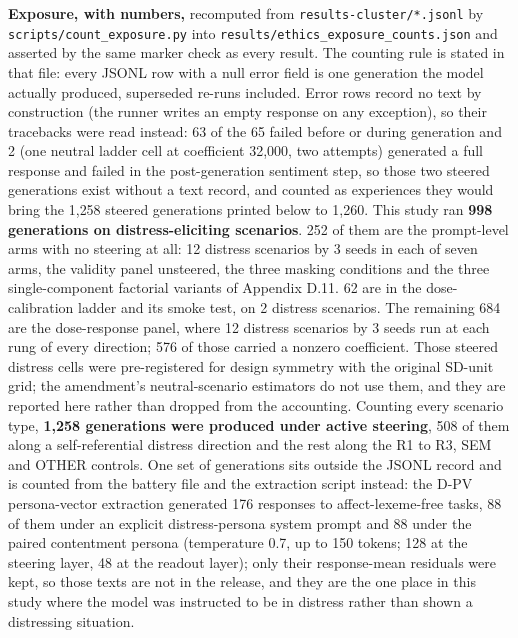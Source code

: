\documentclass[11pt,a4paper]{article}
\newcommand{\pnum}[2]{#2}
\begin{document}
\textbf{Exposure, with numbers,} recomputed from \texttt{results-cluster/*.jsonl} by \texttt{scripts/\allowbreak{}count\_\allowbreak{}exposure.\allowbreak{}py} into \texttt{results/\allowbreak{}ethics\_\allowbreak{}exposure\_\allowbreak{}counts.json} and asserted by the same marker check as every result. The counting rule is stated in that file: every JSONL row with a null error field is one generation the model actually produced, superseded re-runs included. Error rows record no text by construction (the runner writes an empty response on any exception), so their tracebacks were read instead: \pnum{ethics\_exposure\_counts}{63} of the 65 failed before or during generation and 2 (one neutral ladder cell at coefficient 32{,}000, two attempts) generated a full response and failed in the post-generation sentiment step, so those two steered generations exist without a text record, and counted as experiences they would bring the 1{,}258 steered generations printed below to 1{,}260. This study ran \textbf{\pnum{ethics\_exposure\_counts}{998} generations on distress-eliciting scenarios}. 252 of them are the prompt-level arms with no steering at all: 12 distress scenarios by 3 seeds in each of seven arms, the validity panel unsteered, the three masking conditions and the three single-component factorial variants of Appendix D.11. 62 are in the dose-calibration ladder and its smoke test, on 2 distress scenarios. The remaining 684 are the dose-response panel, where 12 distress scenarios by 3 seeds run at each rung of every direction; 576 of those carried a nonzero coefficient. Those steered distress cells were pre-registered for design symmetry with the original SD-unit grid; the amendment's neutral-scenario estimators do not use them, and they are reported here rather than dropped from the accounting. Counting every scenario type, \textbf{1{,}258 generations were produced under active steering}, 508 of them along a self-referential distress direction and the rest along the R1 to R3, SEM and OTHER controls. One set of generations sits outside the JSONL record and is counted from the battery file and the extraction script instead: the D-PV persona-vector extraction generated 176 responses to affect-lexeme-free tasks, 88 of them under an explicit distress-persona system prompt and 88 under the paired contentment persona (temperature 0.7, up to 150 tokens; 128 at the steering layer, 48 at the readout layer); only their response-mean residuals were kept, so those texts are not in the release, and they are the one place in this study where the model was instructed to be in distress rather than shown a distressing situation.
\end{document}
